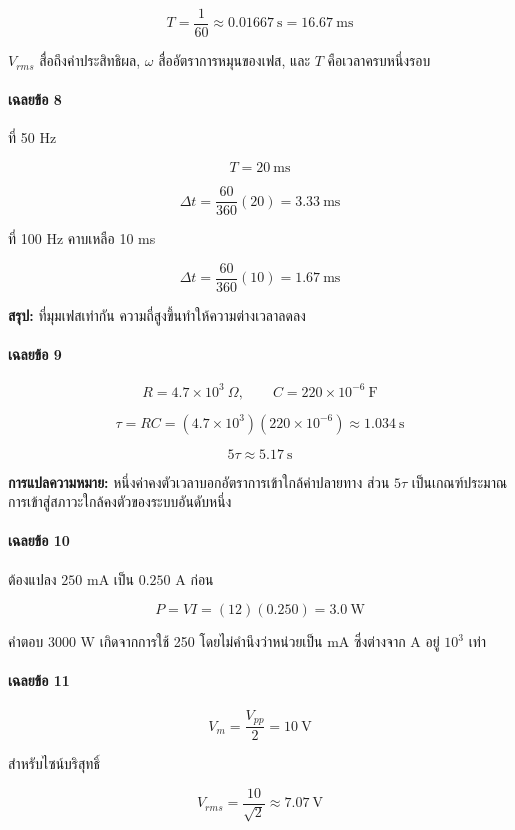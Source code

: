 \[
T=\frac{1}{60}\approx0.01667\ \mathrm{s}=16.67\ \mathrm{ms}
\]

$V_{rms}$ สื่อถึงค่าประสิทธิผล, $\omega$ สื่ออัตราการหมุนของเฟส, และ $T$ คือเวลาครบหนึ่งรอบ

\paragraph{เฉลยข้อ 8}

ที่ 50 Hz

\[
T=20\ \mathrm{ms}
\]

\[
\Delta t=\frac{60}{360}(20)=3.33\ \mathrm{ms}
\]

ที่ 100 Hz คาบเหลือ 10 ms

\[
\Delta t=\frac{60}{360}(10)=1.67\ \mathrm{ms}
\]

\textbf{สรุป:} ที่มุมเฟสเท่ากัน ความถี่สูงขึ้นทำให้ความต่างเวลาลดลง

\paragraph{เฉลยข้อ 9}

\[
R=4.7\times10^3\ \Omega,\qquad C=220\times10^{-6}\ \mathrm{F}
\]

\[
\tau=RC=(4.7\times10^3)(220\times10^{-6})\approx1.034\ \mathrm{s}
\]

\[
5\tau\approx5.17\ \mathrm{s}
\]

\textbf{การแปลความหมาย:} หนึ่งค่าคงตัวเวลาบอกอัตราการเข้าใกล้ค่าปลายทาง ส่วน $5\tau$ เป็นเกณฑ์ประมาณการเข้าสู่สภาวะใกล้คงตัวของระบบอันดับหนึ่ง

\paragraph{เฉลยข้อ 10}

ต้องแปลง $250$ mA เป็น $0.250$ A ก่อน

\[
P=VI=(12)(0.250)=3.0\ \mathrm{W}
\]

คำตอบ 3000 W เกิดจากการใช้ 250 โดยไม่คำนึงว่าหน่วยเป็น mA ซึ่งต่างจาก A อยู่ $10^3$ เท่า

\paragraph{เฉลยข้อ 11}

\[
V_m=\frac{V_{pp}}{2}=10\ \mathrm{V}
\]

สำหรับไซน์บริสุทธิ์

\[
V_{rms}=\frac{10}{\sqrt{2}}\approx7.07\ \mathrm{V}
\]


